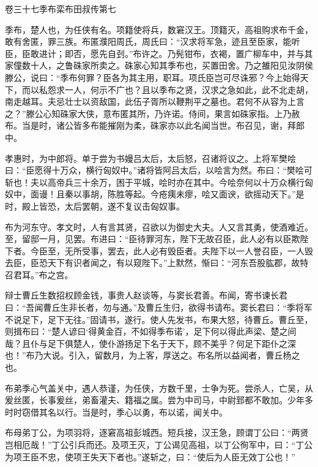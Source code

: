 \documentclass[12pt,UTF8]{ctexbook}
\begin{document}
卷三十七季布栾布田叔传第七



季布，楚人也，为任侠有名。项籍使将兵，数窘汉王。顶籍灭，高祖购求布千金，敢有舍匿，罪三族。布匿濮阳周氏，周氏曰：“汉求将军急，迹且至臣家，能听臣，臣敢进计；即否，愿先自刭。”布许之。乃髡钳布，衣褐，置广柳车中，并与其家僮数十人，之鲁硃家所卖之。硃家心知其季布也，买置田舍。乃之雒阳见汝阴侯滕公，说曰：“季布何罪？臣各为其主用，职耳。项氏臣岂可尽诛邪？今上始得天下，而以私怨求一人，何示不广也？且以季布之贤，汉求之急如此，此不北走胡，南走越耳。夫忌壮士以资敌国，此伍子胥所以鞭荆平之墓也。君何不从容为上言之？”滕公心知硃家大侠，意布匿其所，乃许诺。侍间，果言如硃家指。上乃赦布。当是时，诸公皆多布能摧刚为柔，硃家亦以此名闻当世。布召见，谢，拜郎中。



孝惠时，为中郎将。单于尝为书嫚吕太后，太后怒，召诸将议之。上将军樊哙曰：“臣愿得十万众，横行匈奴中。”诸将皆阿吕太后，以哙言为然。布曰：“樊哙可斩也！夫以高帝兵三十余万，困于平城，哙时亦在其中。今哙奈何以十万众横行匈奴中，面谩！且秦以事胡，陈胜等起。今疮痍未瘳，哙又面谀，欲摇动天下。”是时，殿上皆恐，太后罢朝，遂不复议击匈奴事。



布为河东守。孝文时，人有言其贤，召欲以为御史大夫。人又言其勇，使酒难近。至，留邸一月，见罢。布进曰：“臣待罪河东，陛下无故召臣，此人必有以臣欺陛下者。今臣至，无所受事，罢去，此人必有毁臣者。夫陛下以一人誉召臣，一人毁去臣，臣恐天下有识者闻之，有以窥陛下。”上默然，惭曰：“河东吾股肱郡，故特召君耳。”布之宫。



辩士曹丘生数招权顾金钱，事贵人赵谈等，与窦长君善。布闻，寄书谏长君曰：“吾闻曹丘生非长者，勿与通。”及曹丘生归，欲得书请布。窦长君曰：“季将军不说足下，足下无往。”固请书，遂行。使人先发书，布果大怒，待曹丘。曹丘至，则揖布曰：“楚人谚曰‘得黄金百，不如得季布诺’，足下何以得此声梁、楚之间哉？且仆与足下俱楚人，使仆游扬足下名于天下，顾不美乎？何足下距仆之深也！”布乃大说。引入，留数月，为上客，厚送之。布名所以益闻者，曹丘杨之也。



布弟季心气盖关中，遇人恭谨，为任侠，方数千里，士争为死。尝杀人，亡吴，从爰丝匿，长事爰丝，弟畜灌夫、籍福之属。尝为中司马，中尉郅都不敢加。少年多时时窃借其名以行。当是时，季心以勇，布以诺，闻关中。



布母弟丁公，为项羽将，逐窘高祖彭城西。短兵接，汉王急，顾谓丁公曰：“两贤岂相厄哉！”丁公引兵而还。及项王灭，丁公谒见高祖，以丁公徇军中，曰：“丁公为项王臣不忠，使项王失天下者也。”遂斩之，曰：“使后为人臣无效丁公也！”
\end{document}
